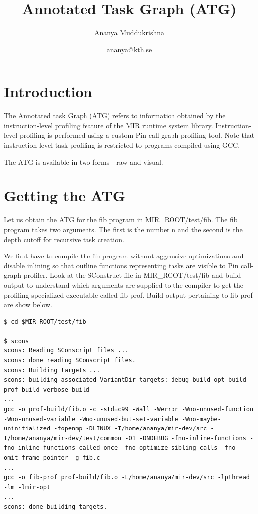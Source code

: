 \documentclass[11pt,a4paper,notitlepage]{article}
\author{Ananya Muddukrishna}
\date{ananya@kth.se}
\title{Annotated Task Graph (ATG)}
\begin{document}
\maketitle


\section{Introduction}
The Annotated task Graph (ATG) refers to information obtained by the instruction-level profiling feature of the MIR runtime system library.
Instruction-level profiling is performed using a custom Pin call-graph profiling tool.
Note that instruction-level task profiling is restricted to programs compiled using GCC.

The ATG is available in two forms - raw and visual.

\section{Getting the ATG}
\label{sec:getting-atg}
Let us obtain the ATG for the fib program in MIR\_ROOT/test/fib.
The fib program takes two arguments. The first is the number n and the second is the depth cutoff for recursive task creation.

We first have to compile the fib program without aggressive optimizations and disable inlining so that outline functions representing tasks are visible to Pin call-graph profiler. 
Look at the SConstruct file in MIR\_ROOT/test/fib and build output to understand which arguments are supplied to the compiler to get the profiling-specialized executable called fib-prof. 
Build output pertaining to fib-prof are show below.

\begin{lstlisting}[style=BashInputStyle]
$ cd $MIR_ROOT/test/fib

$ scons 
scons: Reading SConscript files ...
scons: done reading SConscript files.
scons: Building targets ...
scons: building associated VariantDir targets: debug-build opt-build prof-build verbose-build
...
gcc -o prof-build/fib.o -c -std=c99 -Wall -Werror -Wno-unused-function -Wno-unused-variable -Wno-unused-but-set-variable -Wno-maybe-uninitialized -fopenmp -DLINUX -I/home/ananya/mir-dev/src -I/home/ananya/mir-dev/test/common -O1 -DNDEBUG -fno-inline-functions -fno-inline-functions-called-once -fno-optimize-sibling-calls -fno-omit-frame-pointer -g fib.c
...
gcc -o fib-prof prof-build/fib.o -L/home/ananya/mir-dev/src -lpthread -lm -lmir-opt
...
scons: done building targets.
\end{lstlisting}
\end{document}

